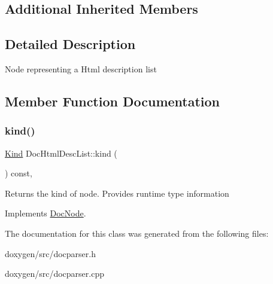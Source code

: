 \subsection*{Additional Inherited Members}


\subsection{Detailed Description}
Node representing a Html description list 

\subsection{Member Function Documentation}
\mbox{\label{class_doc_html_desc_list_a40585d9cdce7ed41801664787ff5fbb1}} 
\subsubsection{\texorpdfstring{kind()}{kind()}}
{\footnotesize\ttfamily \mbox{\hyperlink{class_doc_node_aebd16e89ca590d84cbd40543ea5faadb}{Kind}} Doc\+Html\+Desc\+List\+::kind (\begin{DoxyParamCaption}{ }\end{DoxyParamCaption}) const\hspace{0.3cm}{\ttfamily [inline]}, {\ttfamily [virtual]}}

Returns the kind of node. Provides runtime type information 

Implements \mbox{\hyperlink{class_doc_node_a108ffd214a72ba6e93dac084a8f58049}{Doc\+Node}}.



The documentation for this class was generated from the following files\+:\begin{DoxyCompactItemize}
\item 
doxygen/src/docparser.\+h\item 
doxygen/src/docparser.\+cpp\end{DoxyCompactItemize}
